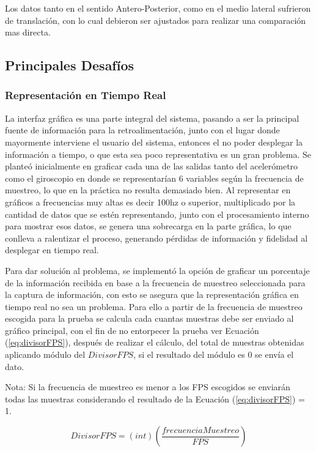 \documentclass[12pt,a4paper]{article}
\begin{document}
Los datos tanto en el sentido Antero-Posterior, como en el medio lateral sufrieron de translación, con lo cual debieron ser ajustados para realizar una comparación mas directa.



\newpage
\subsection{Principales Desafíos}
\subsubsection{Representación en Tiempo Real}
La interfaz gráfica es una parte integral del sistema, pasando a ser la principal fuente de información para la retroalimentación, junto con el lugar donde mayormente interviene el usuario del sistema, entonces el no poder desplegar la información a tiempo, o que esta sea poco representativa es un gran problema. Se planteó inicialmente en graficar cada una de las salidas tanto del acelerómetro como el giroscopio en donde se representarían 6 variables según la frecuencia de muestreo, lo que en la práctica no resulta demasiado bien. Al representar en gráficos a frecuencias muy altas es decir 100hz o superior, multiplicado por la cantidad de datos que se estén representando, junto con el procesamiento interno para mostrar esos datos, se genera una sobrecarga en la parte gráfica, lo que conlleva a ralentizar el proceso, generando pérdidas de información y fidelidad al desplegar en tiempo real.

Para dar solución al problema, se implementó la opción de graficar un porcentaje de la información recibida en base a la frecuencia de muestreo seleccionada para la captura de información, con esto se asegura que la representación gráfica en tiempo real no sea un problema. Para ello a partir de la frecuencia de muestreo escogida para la prueba se calcula cada cuantas muestras debe ser enviado al gráfico principal, con el fin de no entorpecer la prueba ver Ecuación (\ref{eq:divisorFPS}), después de realizar el cálculo, del total de muestras obtenidas aplicando módulo del $DivisorFPS$, si el resultado del módulo es 0 se envía el dato.

Nota: Si la frecuencia de muestreo es menor a los FPS escogidos se enviarán todas las muestras considerando el resultado de la Ecuación (\ref{eq:divisorFPS}) = 1.

\begin{equation}
\label{eq:divisorFPS}
DivisorFPS=(int)\left(\frac{frecuenciaMuestreo}{FPS}\right)
\end{equation}
\end{document}

